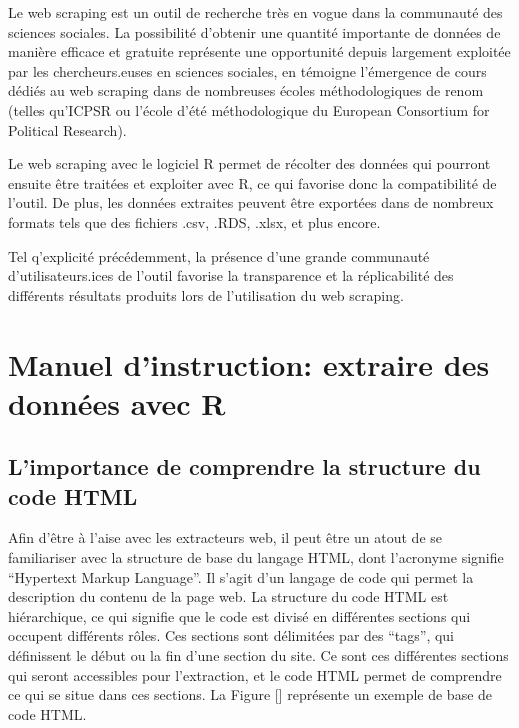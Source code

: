 \documentclass[
  letterpaper,
  DIV=11,
  numbers=noendperiod]{scrreprt}
\begin{document}
Le web scraping est un outil de recherche très en vogue dans la
communauté des sciences sociales. La possibilité d'obtenir une quantité
importante de données de manière efficace et gratuite représente une
opportunité depuis largement exploitée par les chercheurs.euses en
sciences sociales, en témoigne l'émergence de cours dédiés au web
scraping dans de nombreuses écoles méthodologiques de renom (telles
qu'ICPSR ou l'école d'été méthodologique du European Consortium for
Political Research).

Le web scraping avec le logiciel R permet de récolter des données qui
pourront ensuite être traitées et exploiter avec R, ce qui favorise donc
la compatibilité de l'outil. De plus, les données extraites peuvent être
exportées dans de nombreux formats tels que des fichiers .csv, .RDS,
.xlsx, et plus encore.

Tel q'explicité précédemment, la présence d'une grande communauté
d'utilisateurs.ices de l'outil favorise la transparence et la
réplicabilité des différents résultats produits lors de l'utilisation du
web scraping.

\hypertarget{manuel-dinstruction-extraire-des-donnuxe9es-avec-r}{%
\section{Manuel d'instruction: extraire des données avec
R}\label{manuel-dinstruction-extraire-des-donnuxe9es-avec-r}}

\hypertarget{limportance-de-comprendre-la-structure-du-code-html}{%
\subsection{L'importance de comprendre la structure du code
HTML}\label{limportance-de-comprendre-la-structure-du-code-html}}

Afin d'être à l'aise avec les extracteurs web, il peut être un atout de
se familiariser avec la structure de base du langage HTML, dont
l'acronyme signifie ``Hypertext Markup Language''. Il s'agit d'un
langage de code qui permet la description du contenu de la page web. La
structure du code HTML est hiérarchique, ce qui signifie que le code est
divisé en différentes sections qui occupent différents rôles. Ces
sections sont délimitées par des ``tags'', qui définissent le début ou
la fin d'une section du site. Ce sont ces différentes sections qui
seront accessibles pour l'extraction, et le code HTML permet de
comprendre ce qui se situe dans ces sections. La Figure {[}{]}
représente un exemple de base de code HTML.
\end{document}
